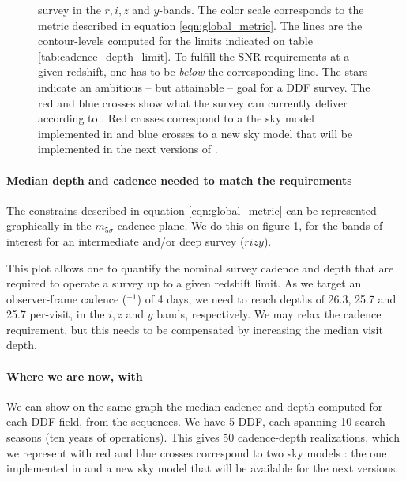 \documentclass[\docopts]{\docclass}
\begin{document}
\begin{figure}[t]
\begin{center}
{  survey in the $r,i,z$ and $y$-bands. The color scale corresponds to
  the metric described in equation \ref{eqn:global_metric}.  The lines are
  the contour-levels computed for the limits indicated on table
  \ref{tab:cadence_depth_limit}. To fulfill the SNR requirements at a
  given redshift, one has to be {\em below} the corresponding
  line. The stars indicate an ambitious -- but attainable -- goal for
  a DDF survey.  The red and blue crosses show what the survey can currently
  deliver according to .  Red crosses correspond to
  a the sky model implemented in  and blue crosses to a
  new sky model that will be implemented in the next versions of . }
\label{fig:m5_cadence_limits_ddf}
\end{center}
\end{figure}

\paragraph{Median depth and cadence needed to match the requirements}
The constrains described in equation \ref{eqn:global_metric} can be
represented graphically in the $m_{5\sigma}$-cadence plane. We do this
on figure \ref{fig:m5_cadence_limits_ddf}, for the bands of interest
for an intermediate and/or deep survey ($rizy$).

This plot allows one to quantify the nominal survey cadence and depth
that are required to operate a survey up to a given redshift limit.
As we target an observer-frame cadence ($^{-1}$) of 4 days, we need to
reach depths of 26.3, 25.7 and 25.7 per-visit, in the $i, z$ and $y$
bands, respectively. We may relax the cadence requirement, but this
needs to be compensated by increasing the median visit depth.






\paragraph{Where we are now, with } We can show on
the same graph the median cadence and depth computed for each DDF
field, from the  sequences. We have 5 DDF, each
spanning 10 search seasons (ten years of operations).  This gives 50
cadence-depth realizations, which we represent with red and blue
crosses correspond to two sky models : the one implemented in
 \cite{1991PASP..103.1033K} and a new sky model that will be
available for the next  versions. 
\end{document}

